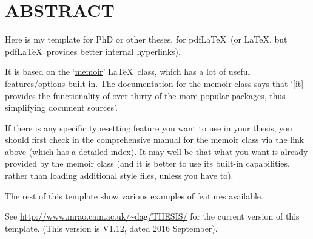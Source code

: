 \chapter*{ABSTRACT}


Here is my template for PhD or other theses, for pdf\LaTeX\ (or \LaTeX,
but pdf\LaTeX\ provides better internal hyperlinks).

It is based on the `\href{http://www.ctan.org/pkg/memoir}{memoir}'
\LaTeX\ class, which has a lot of useful features/options built-in. The
documentation for the memoir class says that `[it] provides the
functionality of over thirty of the more popular packages, thus
simplifying document sources'.

If there is any specific typesetting feature you want to use in your
thesis, you should first check in the comprehensive manual for the
memoir class via the link above (which has a detailed index). It may
well be that what you want is already provided by the memoir class (and
it is better to use its built-in capabilities, rather than loading
additional style files, unless you have to).

The rest of this template show various examples of features available.

See \url{http://www.mrao.cam.ac.uk/~dag/THESIS/} for the current version
of this template. (This version is V1.12, dated 2016 September).

\cleardoublepage

\endinput
